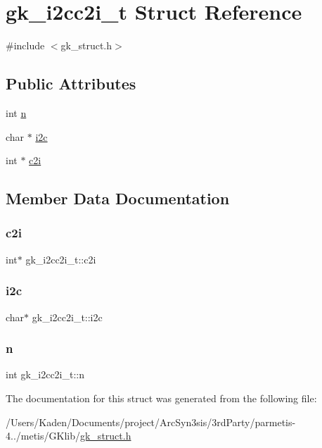 \hypertarget{a00670}{}\section{gk\+\_\+i2cc2i\+\_\+t Struct Reference}
\label{a00670}


{\ttfamily \#include $<$gk\+\_\+struct.\+h$>$}

\subsection*{Public Attributes}
\begin{DoxyCompactItemize}
\item 
int \hyperlink{a00670_a6438cb03410948dfd033854f1c309817}{n}
\item 
char $\ast$ \hyperlink{a00670_a77a49ab7f70200fbb824d61f0ac5cbe3}{i2c}
\item 
int $\ast$ \hyperlink{a00670_aa1c6f6c0f0b2f7008684efa488dc2e93}{c2i}
\end{DoxyCompactItemize}


\subsection{Member Data Documentation}
\mbox{\label{a00670_aa1c6f6c0f0b2f7008684efa488dc2e93}} 
\subsubsection{\texorpdfstring{c2i}{c2i}}
{\footnotesize\ttfamily int$\ast$ gk\+\_\+i2cc2i\+\_\+t\+::c2i}

\mbox{\label{a00670_a77a49ab7f70200fbb824d61f0ac5cbe3}} 
\subsubsection{\texorpdfstring{i2c}{i2c}}
{\footnotesize\ttfamily char$\ast$ gk\+\_\+i2cc2i\+\_\+t\+::i2c}

\mbox{\label{a00670_a6438cb03410948dfd033854f1c309817}} 
\subsubsection{\texorpdfstring{n}{n}}
{\footnotesize\ttfamily int gk\+\_\+i2cc2i\+\_\+t\+::n}



The documentation for this struct was generated from the following file\+:\begin{DoxyCompactItemize}
\item 
/\+Users/\+Kaden/\+Documents/project/\+Arc\+Syn3sis/3rd\+Party/parmetis-\/4../metis/\+G\+Klib/\hyperlink{a00080}{gk\+\_\+struct.\+h}\end{DoxyCompactItemize}
